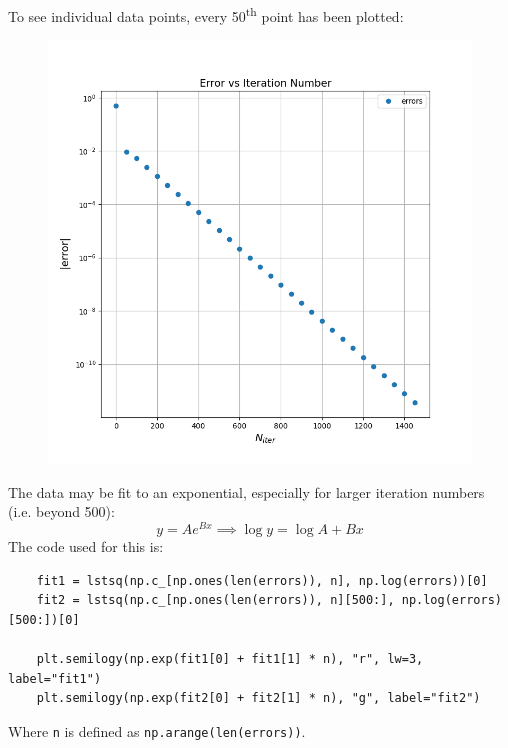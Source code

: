 \documentclass[12pt, a4paper]{article}
\newcommand{\code}{\lstinline[basicstyle=\small]}
\begin{document}
To see individual data points, every 50\textsuperscript{th} point has been plotted:
\begin{figure}[H]
    \centering
    \includegraphics[scale=0.4]{7c.png}
\end{figure}

The data may be fit to an exponential, especially for larger iteration numbers (i.e. beyond 500):
\begin{equation*}
    y = Ae^{Bx} \implies \log y = \log A + Bx
\end{equation*}
The code used for this is:
\begin{lstlisting}
    fit1 = lstsq(np.c_[np.ones(len(errors)), n], np.log(errors))[0]
    fit2 = lstsq(np.c_[np.ones(len(errors)), n][500:], np.log(errors)[500:])[0]

    plt.semilogy(np.exp(fit1[0] + fit1[1] * n), "r", lw=3, label="fit1")
    plt.semilogy(np.exp(fit2[0] + fit2[1] * n), "g", label="fit2")
\end{lstlisting}
Where \code{n} is defined as \code{np.arange(len(errors))}.
\end{document}
